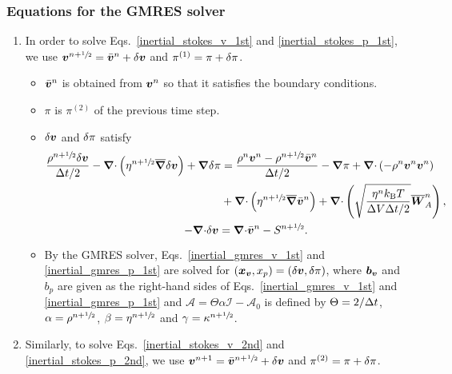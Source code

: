 \documentclass[
10pt
showpacs, showkeys,
amsmath,amssymb,
aps,
pre,
floatfix,
]{revtex4-1}
\newcommand{\divg}{{\V\nabla\cdot}}                       %
\newcommand{\paren}[1]{{(#1)}}                            %
\begin{document}
\subsubsection{Equations for the GMRES solver}

\begin{enumerate}

\item In order to solve Eqs.~\eqref{inertial_stokes_v_1st} and \eqref{inertial_stokes_p_1st}, we use $\boldsymbol{v}^{n+\sfrac{1}{2}}=\bar{\boldsymbol{v}}^n+\delta\boldsymbol{v}$ and $\pi^\paren{1}=\pi+\d{\pi}$.

\begin{itemize}
\item $\bar{\boldsymbol{v}}^n$ is obtained from $\boldsymbol{v}^n$ so that it satisfies the boundary conditions.
\item $\pi$ is $\pi^\paren{2}$ of the previous time step.
\item $\delta\boldsymbol{v}$ and $\delta\pi$ satisfy
\begin{gather}
\label{inertial_gmres_v_1st}
\begin{split}
\frac{\rho^{n+\myhalf}\d{\V{v}}}{\D{t}/2} - \divg\left(\eta^{n+\myhalf}\overline{\grad}\d{\V{v}}\right) + \grad\d{\pi}
& = \frac{\rho^n\V{v}^n-\rho^{n+\myhalf}\bar{\V{v}}^n}{\D{t}/2} - \grad\pi 
+ \divg\left(-\rho^n\V{v}^n\V{v}^n\right) \\
& + \divg\left( \eta^{n+\myhalf} \overline{\grad}\bar{\V{v}}^n \right)
+ \divg\left( \sqrt{\frac{\eta^n k_\mathrm{B}T}{\D{V}\D{t}/2} } \overline{\V{W}}^n_A \right),
\end{split} \\
\label{inertial_gmres_p_1st}
-\divg\d{\V{v}} = \divg\bar{\V{v}}^n-S^{n+\myhalf}.
\end{gather}
\item By the GMRES solver, Eqs.~\eqref{inertial_gmres_v_1st} and \eqref{inertial_gmres_p_1st} are solved for $(\boldsymbol{x}_{\boldsymbol{v}},x_p)=(\delta\boldsymbol{v},\delta\pi)$, where $\boldsymbol{b}_{\boldsymbol{v}}$ and $b_p$ are given as the right-hand sides of Eqs.~\eqref{inertial_gmres_v_1st} and \eqref{inertial_gmres_p_1st} and 
$\mathcal{A}=\Theta\alpha\mathcal{I}-\mathcal{A}_0$ is defined by $\Theta=2/\Delta t$, $\alpha=\rho^{n+\sfrac{1}{2}}$, $\beta=\eta^{n+\sfrac{1}{2}}$ and $\gamma=\kappa^{n+\sfrac{1}{2}}$.
\end{itemize}

\item Similarly, to solve Eqs.~\eqref{inertial_stokes_v_2nd} and \eqref{inertial_stokes_p_2nd}, we use $\boldsymbol{v}^{n+1}=\bar{\boldsymbol{v}}^{n+\sfrac{1}{2}}+\delta\boldsymbol{v}$ and $\pi^\paren{2}=\pi+\d{\pi}$.


\end{enumerate}
\end{document}
